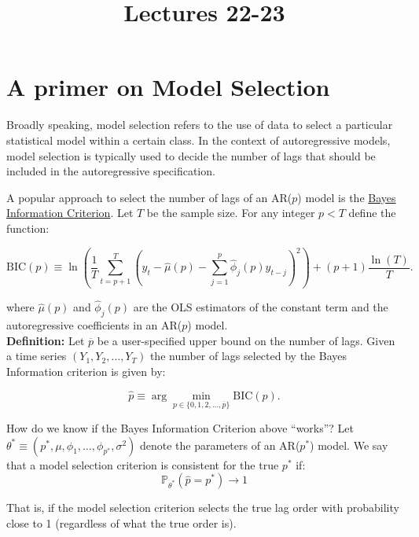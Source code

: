 \documentclass[12] {article}
\begin{document}
\onehalfspace

\title{Lectures 22-23}
\date{}
\maketitle


\section{A primer on Model Selection}

Broadly speaking, model selection refers to the use of data to select a particular statistical model within a certain class. In the context of autoregressive models, model selection is typically used to decide the number of lags that should be included in the autoregressive specification.

A popular approach to select the number of lags of an AR($p$) model is the \underline{Bayes Information Criterion}. Let $T$ be the sample size. For any integer $p<T$ define the function:

\begin{equation}
\textrm{BIC}(p) \equiv \ln \left( \frac{1}{T} \sum_{t=p+1}^{T} (y_t- \widehat{\mu}(p) - \sum_{j=1}^{p} \widehat{\phi}_j(p) y_{t-j} )^2 \right) + (p+1)\frac{\ln (T)}{T}.
\end{equation}

\noindent where $\widehat{\mu}(p)$ and $\widehat{\phi}_j(p)$ are the OLS estimators of the constant term and the autoregressive coefficients in an AR($p$) model. \\

\noindent \textbf{Definition:} Let $\overline{p}$ be a user-specified upper bound on the number of lags. Given a time series $(Y_1,Y_2, \ldots, Y_{T})$ the number of lags selected by the Bayes Information criterion is given by:

\begin{equation}
\widehat{p} \equiv \arg \min_{p \in \{0, 1,2, \ldots, \overline{p}\}} \textrm{BIC}(p).
\end{equation}

\noindent How do we know if the Bayes Information Criterion above ``works\textquotedblright? Let $\theta^* \equiv (p^*, \mu, \phi_1, \ldots, \phi_{p^*},\sigma^2)$ denote the parameters of an AR($p^*$) model. We say that a model selection criterion is consistent for the true $p^*$ if:
\[ \mathbb{P}_{\theta^*} \left( \widehat{p} = p^* \right) \rightarrow 1 \]

\noindent That is, if the model selection criterion selects the true lag order with probability close to 1 (regardless of what the true order is).  
\end{document}
